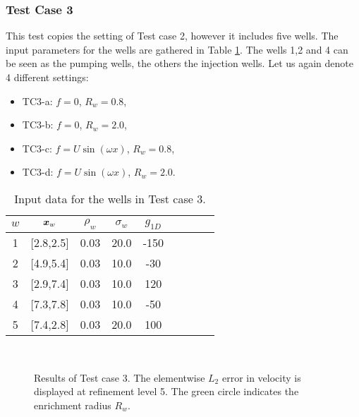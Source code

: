 


\subsubsection{Test Case 3}
This test copies the setting of Test case 2, however it includes five wells.
The input parameters for the wells are gathered in Table \ref{tab:tc3_data}.
The wells 1,2 and 4 can be seen as the pumping wells, the others the injection wells.
Let us again denote 4 different settings:
\begin{itemize}
    \item TC3-a: $f=0$, $R_w=0.8$,
    \item TC3-b: $f=0$, $R_w=2.0$,
    \item TC3-c: $f=U\sin(\omega x)$, $R_w=0.8$,
    \item TC3-d: $f=U\sin(\omega x)$, $R_w=2.0$.
\end{itemize}
%
\begin{table}[!htb]
\begin{center}
\begin{tabular}{ccccccccc}
\toprule
$w$ & $\mathbf{\boldsymbol{x}}_w$  & $\rho_w$ & $\sigma_w$ & $g_{1D}$\\
\midrule
1& [2.8,2.5] & 0.03 & 20.0 & -150 \\
2& [4.9,5.4] & 0.03 & 10.0 & -30 \\
3& [2.9,7.4] & 0.03 & 10.0 & 120 \\
4& [7.3,7.8] & 0.03 & 10.0 & -50 \\
5& [7.4,2.8] & 0.03 & 20.0 & 100 \\
\bottomrule
\end{tabular}
\caption{Input data for the wells in Test case 3.}
\label{tab:tc3_data}
\end{center}
\end{table}
%
\begin{figure}[!htb]
    \centering
     \\
    \caption[Error distribution in Test case 3.]
    {Results of Test case 3. The elementwise $L_2$ error in velocity is displayed at refinement level 5.
    The green circle indicates the enrichment radius $R_w$. }
    \label{fig:mh_tc3_error}
\end{figure}
%

